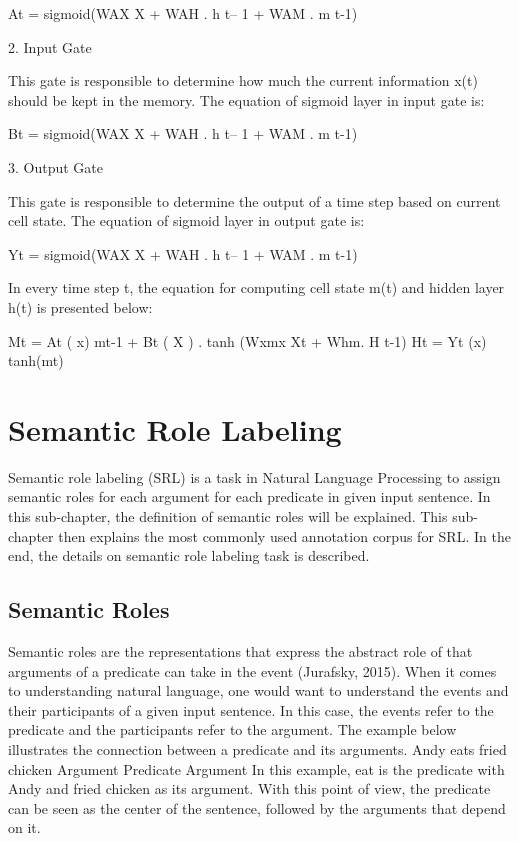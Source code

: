 At = sigmoid(WAX X + WAH . h t– 1 + WAM . m t-1)

2. Input Gate

This gate is responsible to determine how much the current information x(t) should be kept in the memory. The equation of sigmoid layer in input gate is:

Bt = sigmoid(WAX X + WAH . h t– 1 + WAM . m t-1)

3. Output Gate

This gate is responsible to determine the output of a time step based on current cell state. The equation of sigmoid layer in output gate is:

Yt = sigmoid(WAX X + WAH . h t– 1 + WAM . m t-1)

In every time step t, the equation for computing cell state m(t) and hidden layer h(t) is presented below:

Mt = At ( x) mt-1 + Bt ( X ) . tanh (Wxmx Xt + Whm. H t-1)
Ht = Yt (x) tanh(mt)


\section{Semantic Role Labeling}
Semantic role labeling (SRL) is a task in Natural Language Processing to assign semantic roles for each argument for each predicate in given input sentence. In this sub-chapter, the definition of semantic roles will be explained. This sub-chapter then explains the most commonly used annotation corpus for SRL. In the end, the details on semantic role labeling task is described.

\subsection{Semantic Roles}
Semantic roles are the representations that express the abstract role of that arguments of a predicate can take in the event (Jurafsky, 2015). When it comes to understanding natural language, one would want to understand the events and their participants of a given input sentence. In this case, the events refer to the predicate and the participants refer to the argument. The example below illustrates the connection between a predicate and its arguments.
Andy         eats      fried chicken
Argument   Predicate    Argument
In this example, eat is the predicate with Andy and fried chicken as its argument. With this point of view, the predicate can be seen as the center of the sentence, followed by the arguments that depend on it.

